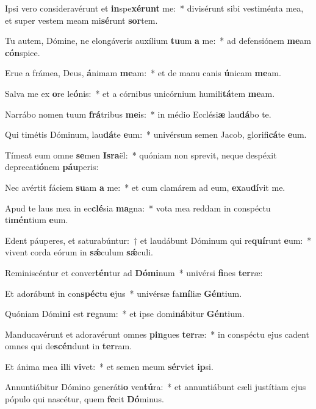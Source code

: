 \item Ipsi vero consideravérunt et \textbf{in}spe\textbf{xé}\textbf{runt} me:~* divisérunt sibi vestiménta mea, et super vestem meam mi\textbf{sé}runt \textbf{sor}tem.
\item Tu autem, Dómine, ne elongáveris auxílium \textbf{tu}um \textbf{a} me:~* ad defensiónem \textbf{me}am \textbf{cón}spice.
\item Erue a frámea, Deus, \textbf{á}nimam \textbf{me}am:~* et de manu canis \textbf{ú}nicam \textbf{me}am.
\item Salva me ex \textbf{o}re le\textbf{ó}nis:~* et a córnibus unicórnium humili\textbf{tá}tem \textbf{me}am.
\item Narrábo nomen tuum \textbf{frá}tribus \textbf{me}is:~* in médio Ecclési\textbf{æ} lau\textbf{dá}bo te.
\item Qui timétis Dóminum, lau\textbf{dá}te \textbf{e}um:~* univérsum semen Jacob, glorifi\textbf{cá}te \textbf{e}um.
\item Tímeat eum omne \textbf{se}men \textbf{Is}\textbf{ra}ël:~* quóniam non sprevit, neque despéxit deprecati\textbf{ó}nem \textbf{páu}peris:
\item Nec avértit fáciem \textbf{su}am \textbf{a} me:~* et cum clamárem ad eum, \textbf{ex}au\textbf{dí}vit me.
\item Apud te laus mea in ec\textbf{clé}sia \textbf{ma}gna:~* vota mea reddam in conspéctu ti\textbf{mén}tium \textbf{e}um.
\item Edent páuperes, et saturabúntur:~† et laudábunt Dóminum qui re\textbf{quí}runt \textbf{e}um:~* vivent corda eórum in \textbf{sǽ}culum \textbf{sǽ}culi.
\item Reminiscéntur et conver\textbf{tén}tur ad \textbf{Dó}\textbf{mi}num~* univérsi \textbf{fi}nes \textbf{ter}ræ:
\item Et adorábunt in con\textbf{spéc}tu \textbf{e}jus~* univérsæ fa\textbf{mí}liæ \textbf{Gén}tium.
\item Quóniam Dómi\textbf{ni} est \textbf{re}gnum:~* et ipse domi\textbf{ná}bitur \textbf{Gén}tium.
\item Manducavérunt et adoravérunt omnes \textbf{pin}gues \textbf{ter}ræ:~* in conspéctu ejus cadent omnes qui de\textbf{scén}dunt in \textbf{ter}ram.
\item Et ánima mea \textbf{il}li \textbf{vi}vet:~* et semen meum \textbf{sér}viet \textbf{ip}si.
\item Annuntiábitur Dómino generáti\textbf{o} ven\textbf{tú}ra:~* et annuntiábunt cæli justítiam ejus pópulo qui nascétur, quem \textbf{fe}cit \textbf{Dó}minus.
